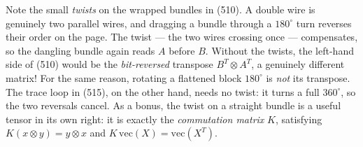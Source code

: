 Note the small \emph{twists} on the wrapped bundles in (510).
A double wire is genuinely two parallel wires,
and dragging a bundle through a $180^\circ$ turn reverses their order on the page.
The twist --- the two wires crossing once --- compensates,
so the dangling bundle again reads $A$ before $B$.
Without the twists, the left-hand side of (510) would be the \emph{bit-reversed} transpose $B^T \otimes A^T$,
a genuinely different matrix!
For the same reason, rotating a flattened block $180^\circ$ is \emph{not} its transpose.
The trace loop in (515), on the other hand, needs no twist:
it turns a full $360^\circ$, so the two reversals cancel.
As a bonus, the twist on a straight bundle is a useful tensor in its own right:
it is exactly the \emph{commutation matrix} $K$,
satisfying $K(x \otimes y) = y \otimes x$ and $K\,\mathrm{vec}(X) = \mathrm{vec}(X^T)$.

